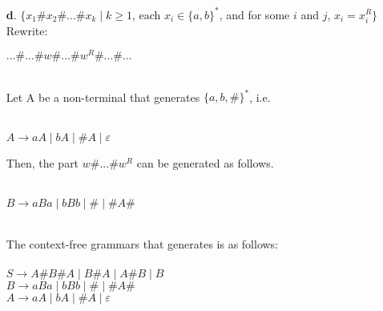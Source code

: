 \documentclass[12pt]{letter}
\begin{document}
\begin{enumerate}
\begin{enumerate}
	\item[\textbf{d}.] $\{ x_1\#x_2\#...\#x_k \mid k \geq1$, each $x_i \in \{a,b\}^*$, and for some $i$ and $j$, $x_i = x_i^R\}$
	\leavevmode \\
	Rewrite: \\
	\begin{center} $...\#...\#w\#...\#w^R\#...\#...$\end{center}
	\leavevmode \\
	Let A be a non-terminal that generates $\{a, b, \#\}^*$, i.e.\\
	\leavevmode \\
	\begin{center} $A \rightarrow aA \mid bA \mid \#A \mid \varepsilon$\end{center}
	Then, the part $w\#...\#w^R$ can be generated as follows.\\
	\leavevmode \\
	\begin{center} $B \rightarrow aBa \mid bBb \mid \# \mid \#A\#$\end{center}
	\leavevmode \\
	The context-free grammars that generates is as follows: \\
	\leavevmode \\
	\setlength\parindent{100pt} 
	$S \rightarrow A\#B\#A \mid B\#A \mid A\#B \mid B$\\
	$B \rightarrow aBa \mid bBb \mid \# \mid \#A\#$ \\
	$A \rightarrow aA \mid bA \mid \#A \mid \varepsilon$
	\setlength\parindent{0pt} 
\end{enumerate}


\end{enumerate}
\end{document}
